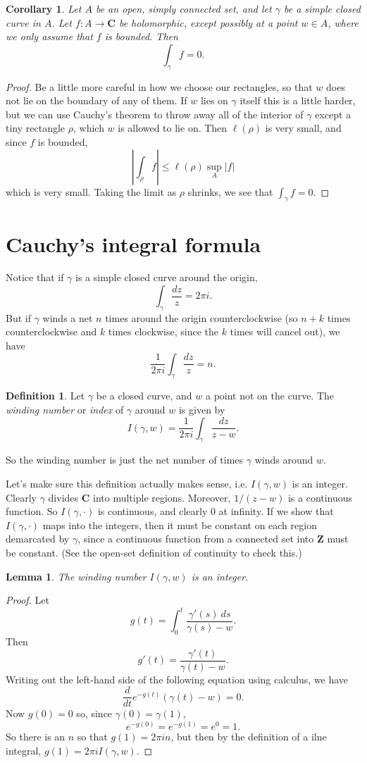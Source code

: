 \documentclass[12pt]{report}
\newcommand{\ZZ}{\mathbf{Z}}
\newcommand{\CC}{\mathbf{C}}
\newcommand{\dfn}[1]{\emph{#1}\index{#1}}
\newtheorem{lemma}[theorem]{Lemma}
\newtheorem{corollary}[theorem]{Corollary}
\theoremstyle{definition}
\newtheorem{definition}[theorem]{Definition}
\theoremstyle{remark}
\begin{document}
\begin{corollary}
Let $A$ be an open, simply connected set, and let $\gamma$ be a simple closed curve in $A$. Let $f: A \to \CC$ be holomorphic, except possibly at a point $w \in A$, where we only assume that $f$ is bounded. Then
$$\int_\gamma f = 0.$$
\end{corollary}
\begin{proof}
Be a little more careful in how we choose our rectangles, so that $w$ does not lie on the boundary of any of them. If $w$ lies on $\gamma$ itself this is a little harder, but we can use Cauchy's theorem to throw away all of the interior of $\gamma$ except a tiny rectangle $\rho$, which $w$ is allowed to lie on. Then $\ell(\rho)$ is very small, and since $f$ is bounded,
$$\left|\int_\rho f\right| \leq \ell(\rho) \sup_A |f|$$
which is very small. Taking the limit as $\rho$ shrinks, we see that $\int_\gamma f = 0$.
\end{proof}
\section{Cauchy's integral formula}
Notice that if $\gamma$ is a simple closed curve around the origin,
$$\int_\gamma \frac{dz}{z} = 2\pi i.$$
But if $\gamma$ winds a net $n$ times around the origin counterclockwise (so $n + k$ times counterclockwise and $k$ times clockwise, since the $k$ times will cancel out), we have
$$\frac{1}{2\pi i} \int_\gamma \frac{dz}{z} = n.$$
\begin{definition}
Let $\gamma$ be a closed curve, and $w$ a point not on the curve. The \dfn{winding number} or \dfn{index} of $\gamma$ around $w$ is given by
$$I(\gamma, w) = \frac{1}{2\pi i} \int_\gamma \frac{dz}{z - w}.$$
\end{definition}
So the winding number is just the net number of times $\gamma$ winds around $w$.

Let's make sure this definition actually makes sense, i.e. $I(\gamma, w)$ is an integer. Clearly $\gamma$ divides $\CC$ into multiple regions. Moreover, $1/(z-w)$ is a continuous function. So $I(\gamma, \cdot)$ is continuous, and clearly $0$ at infinity. If we show that $I(\gamma, \cdot)$ maps into the integers, then it must be constant on each region demarcated by $\gamma$, since a continuous function from a connected set into $\ZZ$ must be constant. (See the open-set definition of continuity to check this.)

\begin{lemma}
The winding number $I(\gamma, w)$ is an integer.
\end{lemma}
\begin{proof}
Let
$$g(t) = \int_0^t \frac{\gamma'(s) ~ds}{\gamma(s) - w}.$$
Then
$$g'(t) = \frac{\gamma'(t)}{\gamma(t) - w}.$$
Writing out the left-hand side of the following equation using calculus, we have
$$\frac{d}{dt}e^{-g(t)}(\gamma(t) - w) = 0.$$
Now $g(0) = 0$ so, since $\gamma(0) = \gamma(1)$,
$$e^{-g(0)} = e^{-g(1)} = e^0 = 1.$$
So there is an $n$ so that $g(1) = 2\pi in$, but then by the definition of a ilne integral, $g(1) = 2\pi i I(\gamma, w)$.
\end{proof}
\end{document}
